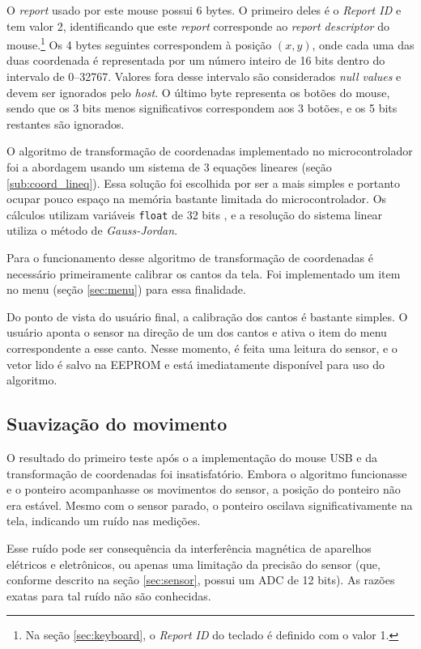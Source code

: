 \documentclass[brazil,pagestart=firstchapter]{abnt}
\begin{document}
O \textit{report} usado por este mouse possui 6 bytes. O primeiro deles é
o \textit{Report ID} e tem valor 2, identificando que este \textit{report}
corresponde ao \textit{report descriptor} do mouse.\footnote{
	Na seção \ref{sec:keyboard}, o \textit{Report ID} do teclado é definido
	com o valor 1.
} Os 4 bytes seguintes correspondem à posição $(x, y)$, onde cada uma das
duas coordenada é representada por um número inteiro de 16 bits dentro do
intervalo de \numrange{0}{32767}. Valores fora desse intervalo são
considerados \textit{null values} e devem ser ignorados pelo \textit{host}.
\cite[p.~20]{usbhid} O último byte representa os botões do mouse, sendo que
os 3 bits menos significativos correspondem aos 3 botões, e os 5 bits
restantes são ignorados.

O algoritmo de transformação de coordenadas implementado no microcontrolador
foi a abordagem usando um sistema de 3 equações lineares (seção
\ref{sub:coord_lineq}). Essa solução foi escolhida por ser a mais simples e
portanto ocupar pouco espaço na memória bastante limitada do
microcontrolador. Os cálculos utilizam variáveis \texttt{float} de 32 bits
\cite{avrlibcfaq}, e a resolução do sistema linear utiliza o método de
\textit{Gauss-Jordan}. \cite{GaussJordanInPython}

Para o funcionamento desse algoritmo de transformação de coordenadas é
necessário primeiramente calibrar os cantos da tela. Foi implementado um
item no menu (seção \ref{sec:menu}) para essa finalidade.

Do ponto de vista do usuário final, a calibração dos cantos é bastante
simples. O usuário aponta o sensor na direção de um dos cantos e ativa o
item do menu correspondente a esse canto. Nesse momento, é feita uma leitura
do sensor, e o vetor lido é salvo na \ac{EEPROM} e está imediatamente
disponível para uso do algoritmo.

\subsection{Suavização do movimento}
\label{sub:mouse_smoothing}

O resultado do primeiro teste após o a implementação do mouse \ac{USB} e da
transformação de coordenadas foi insatisfatório. Embora o algoritmo
funcionasse e o ponteiro acompanhasse os movimentos do sensor, a posição do
ponteiro não era estável. Mesmo com o sensor parado, o ponteiro oscilava
significativamente na tela, indicando um ruído nas medições.

Esse ruído pode ser consequência da interferência magnética de aparelhos
elétricos e eletrônicos, ou apenas uma limitação da precisão do sensor (que,
conforme descrito na seção \ref{sec:sensor}, possui um \ac{ADC} de 12 bits).
As razões exatas para tal ruído não são conhecidas.
\end{document}

